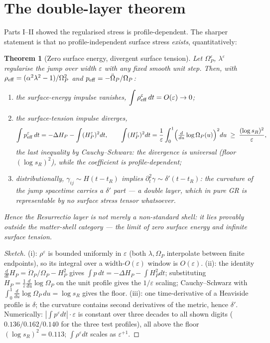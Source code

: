 \documentclass[11pt,a4paper,oneside]{book}
\newcommand{\Op}{\Omega_P}
\newcommand{\sR}{s_R}
\theoremstyle{plain}
\newtheorem{theorem}{Theorem}[chapter]
\theoremstyle{definition}
\theoremstyle{remark}
\begin{document}
\section{The double-layer theorem}

Parts I--II showed the regularised stress is profile-dependent. The sharper statement is that no
profile-independent surface stress \emph{exists}, quantitatively:

\begin{theorem}[Zero surface energy, divergent surface tension]\label{resurrectiosurgeryIII:thm:double}
Let $\Op^\varepsilon$, $\lambda^\varepsilon$ regularise the jump over width $\varepsilon$ with any fixed
smooth unit step. Then, with $\rho_{\rm eff}=(\alpha^2\lambda^2-1)/\Op^2$ and
$p_{\rm eff}=-\ddot\Op/\Op$:
\begin{enumerate}[label=(\roman*),leftmargin=1.8em,itemsep=2pt]
\item the surface-energy impulse vanishes,
$\displaystyle\int\rho_{\rm eff}^\varepsilon\,dt=O(\varepsilon)\to0$;
\item the surface-tension impulse diverges,
\begin{equation}
\int p_{\rm eff}^\varepsilon\,dt
=-\Delta H_P-\int (H_P^\varepsilon)^2dt,
\qquad
\int (H_P^\varepsilon)^2dt
=\frac{1}{\varepsilon}\int_0^1\Bigl(\tfrac{d}{du}\log\Op(u)\Bigr)^2du
\;\ge\;\frac{(\log\sR)^2}{\varepsilon},
\end{equation}
the last inequality by Cauchy--Schwarz: the divergence is \emph{universal} (floor $(\log\sR)^2$),
while the coefficient is profile-dependent;
\item distributionally, $\gamma_{ij}\sim H(t-t_R)$ implies $\partial_t^2\gamma\sim\delta'(t-t_R)$: the
curvature of the jump spacetime carries a $\delta'$ part --- a \emph{double layer}, which in pure GR is
representable by no surface stress tensor whatsoever.
\end{enumerate}
Hence the Resurrectio layer is not merely a non-standard shell: it lies provably outside the
matter-shell category --- the limit of zero surface energy and infinite surface tension.
\end{theorem}
\begin{proof}[Sketch]
(i): $\rho^\varepsilon$ is bounded uniformly in $\varepsilon$ (both $\lambda,\Op$ interpolate between
finite endpoints), so its integral over a width-$O(\varepsilon)$ window is $O(\varepsilon)$.
(ii): the identity $\tfrac{d}{dt}H_P=\ddot\Op/\Op-H_P^2$ gives
$\int p\,dt=-\Delta H_P-\int H_P^2dt$; substituting $H_P=\tfrac1\varepsilon\tfrac{d}{du}\log\Op$ on the
unit profile gives the $1/\varepsilon$ scaling; Cauchy--Schwarz with
$\int_0^1\tfrac{d}{du}\log\Op\,du=\log\sR$ gives the floor. (iii): one time-derivative of a Heaviside
profile is $\delta$; the curvature contains second derivatives of the metric, hence $\delta'$.
Numerically: $|\!\int p^\varepsilon dt|\cdot\varepsilon$ is constant over three decades to all shown
digits ($0.136/0.162/0.140$ for the three test profiles), all above the floor $(\log\sR)^2=0.113$;
$\int\rho^\varepsilon dt$ scales as $\varepsilon^{+1}$.
\end{proof}
\end{document}
